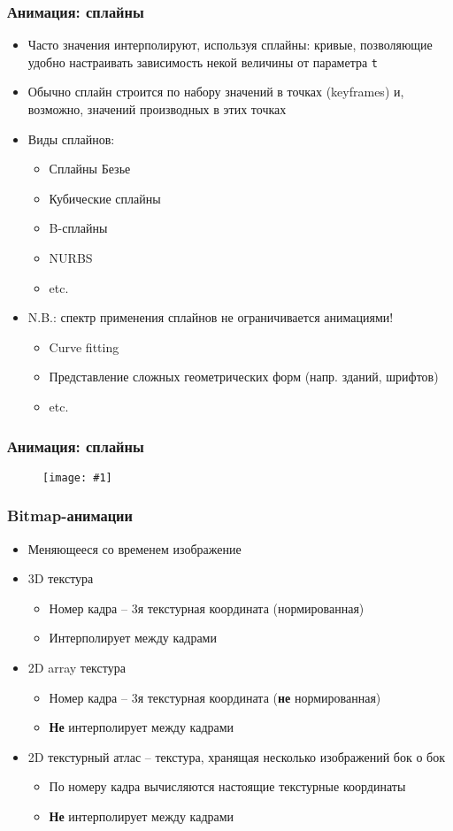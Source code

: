 \documentclass{beamer}
\newcommand{\slideimage}[1]{
  \begin{figure}
    \begin{adjustbox}{width=\textwidth, totalheight=\textheight-2\baselineskip-2\baselineskip,keepaspectratio}
      \texttt{[image: \#1]}
    \end{adjustbox}
  \end{figure}
}
\begin{document}
\begin{frame}[fragile]
\frametitle{Анимация: сплайны}
\begin{itemize}
\item Часто значения интерполируют, используя сплайны: кривые, позволяющие удобно настраивать зависимость некой величины от параметра \verb|t|
\pause
\item Обычно сплайн строится по набору значений в точках (keyframes) и, возможно, значений производных в этих точках
\pause
\item Виды сплайнов:
\begin{itemize}
\item Сплайны Безье
\item Кубические сплайны
\item B-сплайны
\item NURBS
\item etc.
\end{itemize}
\pause
\item N.B.: спектр применения сплайнов не ограничивается анимациями!
\begin{itemize}
\item Curve fitting
\item Представление сложных геометрических форм (напр. зданий, шрифтов)
\item etc.
\end{itemize}
\end{itemize}
\end{frame}

\begin{frame}[fragile]
\frametitle{Анимация: сплайны}
\slideimage{spline-editing.png}
\end{frame}

\begin{frame}[fragile]
\frametitle{Bitmap-анимации}
\begin{itemize}
\item Меняющееся со временем изображение
\pause
\item 3D текстура
\begin{itemize}
\item Номер кадра -- 3я текстурная координата (нормированная)
\item Интерполирует между кадрами
\end{itemize}
\pause
\item 2D array текстура
\begin{itemize}
\item Номер кадра -- 3я текстурная координата (\textbf{не} нормированная)
\item \textbf{Не} интерполирует между кадрами
\end{itemize}
\pause
\item 2D текстурный атлас -- текстура, хранящая несколько изображений бок о бок
\begin{itemize}
\item По номеру кадра вычисляются настоящие текстурные координаты
\item \textbf{Не} интерполирует между кадрами
\end{itemize}
\end{itemize}
\end{frame}
\end{document}
